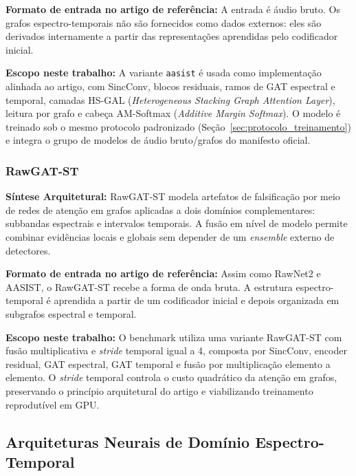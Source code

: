 \documentclass[12pt,a4paper]{article}
\begin{document}
\par\textbf{Formato de entrada no artigo de referência:} A entrada é áudio
bruto. Os grafos espectro-temporais não são fornecidos como dados externos:
eles são derivados internamente a partir das representações aprendidas pelo
codificador inicial.

\par\textbf{Escopo neste trabalho:} A variante \texttt{aasist} é usada como
implementação alinhada ao artigo, com SincConv, blocos residuais, ramos de GAT
espectral e temporal, camadas HS-GAL (\textit{Heterogeneous Stacking Graph
Attention Layer}), leitura por grafo e cabeça AM-Softmax (\textit{Additive
Margin Softmax}). O modelo é treinado sob o mesmo protocolo padronizado
(Seção~\ref{sec:protocolo_treinamento}) e integra o grupo de modelos de áudio
bruto/grafos do manifesto oficial.

\subsubsection*{RawGAT-ST \cite{tak2021rawgatst}}
\textbf{Síntese Arquitetural:} RawGAT-ST modela artefatos de falsificação por
meio de redes de atenção em grafos aplicadas a dois domínios complementares:
subbandas espectrais e intervalos temporais. A fusão em nível de modelo permite
combinar evidências locais e globais sem depender de um \textit{ensemble} externo
de detectores.

\par\textbf{Formato de entrada no artigo de referência:} Assim como RawNet2 e
AASIST, o RawGAT-ST recebe a forma de onda bruta. A estrutura espectro-temporal
é aprendida a partir de um codificador inicial e depois organizada em subgrafos
espectral e temporal.

\par\textbf{Escopo neste trabalho:} O benchmark utiliza uma variante RawGAT-ST
com fusão multiplicativa e \textit{stride} temporal igual a \num{4}, composta por
SincConv, encoder residual, GAT espectral, GAT temporal e fusão por
multiplicação elemento a elemento. O
\textit{stride} temporal controla o custo quadrático da atenção em grafos,
preservando o princípio arquitetural do artigo e viabilizando treinamento
reprodutível em GPU.

\subsection{Arquiteturas Neurais de Domínio Espectro-Temporal}
\label{subsec:espectrais}
\end{document}
